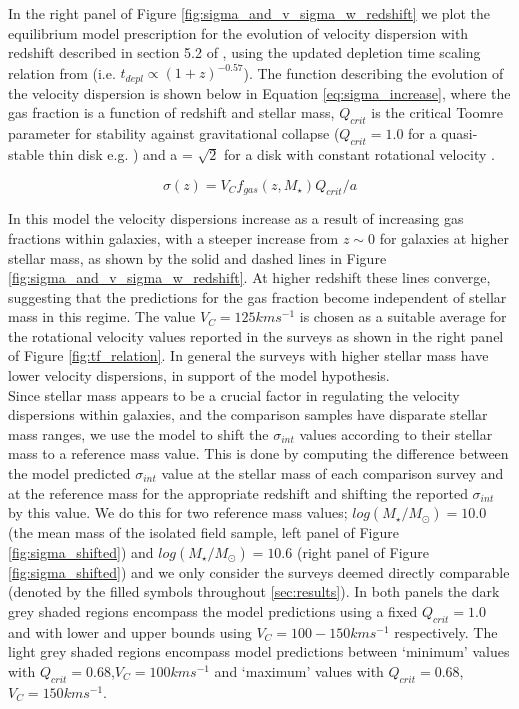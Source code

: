 \documentclass[fleqn,usenatbib]{mn2e}
\begin{document}
In the right panel of Figure \ref{fig:sigma_and_v_sigma_w_redshift} we plot the equilibrium model prescription for the evolution of velocity dispersion with redshift described in section 5.2 of \cite{Wisnioski2015}, using the updated depletion time scaling relation from \cite{Tacconi2017} (i.e. $t_{depl} \propto (1 + z)^{-0.57}$).
The function describing the evolution of the velocity dispersion is shown below in Equation \ref{eq:sigma_increase}, where the gas fraction is a function of redshift and stellar mass, $Q_{crit}$ is the critical Toomre parameter for stability against gravitational collapse \citep{Toomre1964} ($Q_{crit} = 1.0$ for a quasi-stable thin disk e.g. \citealt{ForsterSchreiber2006,Burkert2010,Genzel2011,Wisnioski2015}) and a = $\sqrt{2}$ for a disk with constant rotational velocity \citep{Wisnioski2015}. 

\begin{equation}\label{eq:sigma_increase}
    \sigma(z) = V_{C}f_{gas}(z,M_{\star})Q_{crit}/a
\end{equation}

In this model the velocity dispersions increase as a result of increasing gas fractions within galaxies, with a steeper increase from $z\sim0$ for galaxies at higher stellar mass, as shown by the solid and dashed lines in Figure \ref{fig:sigma_and_v_sigma_w_redshift}.
At higher redshift these lines converge, suggesting that the predictions for the gas fraction become independent of stellar mass in this regime.
The value $V_{C}=125kms^{-1}$ is chosen as a suitable average for the rotational velocity values reported in the surveys as shown in the right panel of Figure \ref{fig:tf_relation}.
In general the surveys with higher stellar mass have lower velocity dispersions, in support of the model hypothesis. \\

Since stellar mass appears to be a crucial factor in regulating the velocity dispersions within galaxies, and the comparison samples have disparate stellar mass ranges, we use the model to shift the $\sigma_{int}$ values according to their stellar mass to a reference mass value.
This is done by computing the difference between the model predicted $\sigma_{int}$ value at the stellar mass of each comparison survey and at the reference mass for the appropriate redshift and shifting the reported $\sigma_{int}$ by this value.
We do this for two reference mass values; $log(M_{\star}/M_{\odot}) = 10.0$ (the mean mass of the isolated field sample, left panel of Figure \ref{fig:sigma_shifted}) and $log(M_{\star}/M_{\odot}) = 10.6$ (right panel of Figure \ref{fig:sigma_shifted}) and we only consider the surveys deemed directly comparable (denoted by the filled symbols throughout \cref{sec:results}).
In both panels the dark grey shaded regions encompass the model predictions using a fixed $Q_{crit} = 1.0$ and with lower and upper bounds using $V_{C} = 100-150kms^{-1}$ respectively.
The light grey shaded regions encompass model predictions between `minimum' values with $Q_{crit} = 0.68$,$V_{C}=100kms^{-1}$ and `maximum' values with $Q_{crit} = 0.68$,$V_{C}=150kms^{-1}$. \\
\end{document}
